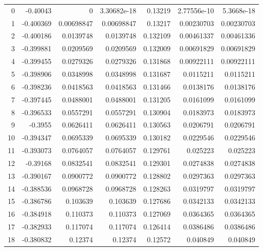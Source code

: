 \begin{tabular}{rrrrrrr}
\hline
   0 & -0.40043     & 0           & 3.30682e-18 &  0.13219     & 2.77556e-10 & 5.3668e-18  \\
   1 & -0.400369    & 0.00698847  & 0.00698847  &  0.13217     & 0.00230703  & 0.00230703  \\
   2 & -0.400186    & 0.0139748   & 0.0139748   &  0.132109    & 0.00461337  & 0.00461336  \\
   3 & -0.399881    & 0.0209569   & 0.0209569   &  0.132009    & 0.00691829  & 0.00691829  \\
   4 & -0.399455    & 0.0279326   & 0.0279326   &  0.131868    & 0.00922111  & 0.00922111  \\
   5 & -0.398906    & 0.0348998   & 0.0348998   &  0.131687    & 0.0115211   & 0.0115211   \\
   6 & -0.398236    & 0.0418563   & 0.0418563   &  0.131466    & 0.0138176   & 0.0138176   \\
   7 & -0.397445    & 0.0488001   & 0.0488001   &  0.131205    & 0.0161099   & 0.0161099   \\
   8 & -0.396533    & 0.0557291   & 0.0557291   &  0.130904    & 0.0183973   & 0.0183973   \\
   9 & -0.3955      & 0.0626411   & 0.0626411   &  0.130563    & 0.0206791   & 0.0206791   \\
  10 & -0.394347    & 0.0695339   & 0.0695339   &  0.130182    & 0.0229546   & 0.0229546   \\
  11 & -0.393073    & 0.0764057   & 0.0764057   &  0.129761    & 0.025223    & 0.025223    \\
  12 & -0.39168     & 0.0832541   & 0.0832541   &  0.129301    & 0.0274838   & 0.0274838   \\
  13 & -0.390167    & 0.0900772   & 0.0900772   &  0.128802    & 0.0297363   & 0.0297363   \\
  14 & -0.388536    & 0.0968728   & 0.0968728   &  0.128263    & 0.0319797   & 0.0319797   \\
  15 & -0.386786    & 0.103639    & 0.103639    &  0.127686    & 0.0342133   & 0.0342133   \\
  16 & -0.384918    & 0.110373    & 0.110373    &  0.127069    & 0.0364365   & 0.0364365   \\
  17 & -0.382933    & 0.117074    & 0.117074    &  0.126414    & 0.0386486   & 0.0386486   \\
  18 & -0.380832    & 0.12374     & 0.12374     &  0.12572     & 0.040849    & 0.040849    \\

\end{tabular}
